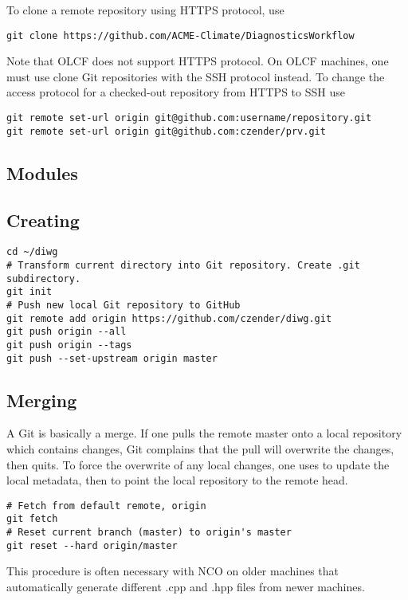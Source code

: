 \documentclass[12pt,twoside]{article}
\begin{document}
To clone a remote repository using HTTPS protocol, use
\begin{verbatim}
git clone https://github.com/ACME-Climate/DiagnosticsWorkflow
\end{verbatim}
Note that OLCF does not support HTTPS protocol.
On OLCF machines, one must use clone Git repositories with the 
SSH protocol instead.
To change the access protocol for a checked-out repository from
HTTPS to SSH use
\begin{verbatim}
git remote set-url origin git@github.com:username/repository.git
git remote set-url origin git@github.com:czender/prv.git
\end{verbatim}

\subsection{Modules}\label{sxn:git_mdl}

\subsection{Creating}\label{sxn:git_crt}

\begin{verbatim}
cd ~/diwg
# Transform current directory into Git repository. Create .git subdirectory.
git init
# Push new local Git repository to GitHub
git remote add origin https://github.com/czender/diwg.git
git push origin --all
git push origin --tags
git push --set-upstream origin master
\end{verbatim}

\subsection{Merging}\label{sxn:git_mrg}

A Git  is basically a merge.
If one pulls the remote master onto a local repository which contains
changes, Git complains that the pull will overwrite the changes, then
quits. 
To force the overwrite of any local changes, one uses 
to update the local metadata, then  to point the local
repository to the remote head.
\begin{verbatim}
# Fetch from default remote, origin
git fetch
# Reset current branch (master) to origin's master
git reset --hard origin/master
\end{verbatim}
This procedure is often necessary with NCO on older machines that
automatically generate different .cpp and .hpp files from newer
machines.  
\end{document}
